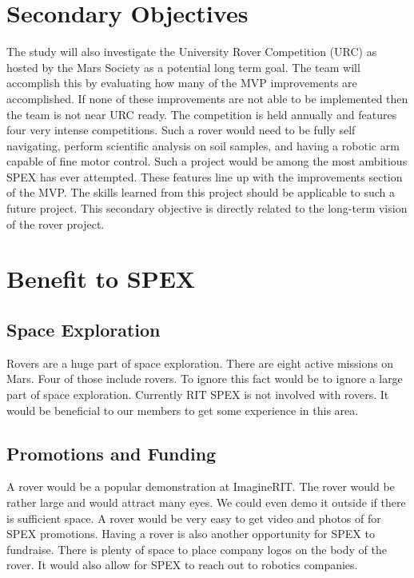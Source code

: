 \documentclass[conference]{IEEEtran} %
\begin{document}
\section{Secondary Objectives}
\label{sec:secondary-obj}
The study will also investigate the University Rover Competition (URC) as hosted by the Mars Society as a potential long term goal. 
The team will accomplish this by evaluating how many of the MVP improvements are accomplished. 
If none of these improvements are not able to be implemented then the team is not near URC ready.
The competition is held annually and features four very intense competitions. 
Such a rover would need to be fully self navigating, perform scientific analysis on soil samples, and having a robotic arm capable of fine motor control. 
Such a project would be among the most ambitious SPEX has ever attempted. 
These features line up with the improvements section of the MVP.
The skills learned from this project should be applicable to such a future project. 
This secondary objective is directly related to the long-term vision of the rover project. 

\section{Benefit to SPEX}
\label{sec:benefit}

\subsection{Space Exploration}
\label{subsec:spacex}
Rovers are a huge part of space exploration. 
There are eight active missions on Mars. 
Four of those include rovers. 
To ignore this fact would be to ignore a large part of space exploration.
Currently RIT SPEX is not involved with rovers.
It would be beneficial to our members to get some experience in this area.

\subsection{Promotions and Funding}
\label{subsec:promos}
A rover would be a popular demonstration at ImagineRIT.
The rover would be rather large and would attract many eyes. 
We could even demo it outside if there is sufficient space. 
A rover would be very easy to get video and photos of for SPEX promotions. 
Having a rover is also another opportunity for SPEX to fundraise. 
There is plenty of space to place company logos on the body of the rover. 
It would also allow for SPEX to reach out to robotics companies.
\end{document}
